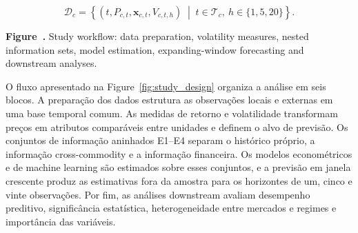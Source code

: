 \documentclass[a4paper,fleqn]{cas-sc}
\begin{document}
\begin{equation}
\mathcal{D}_{c}=\left\{\left(t,P_{c,t},\mathbf{x}_{c,t},V_{c,t,h}\right)\;\middle|\;t\in\mathcal{T}_{c},\ h\in\{1,5,20\}\right\}.
\label{eq:data_unit}
\end{equation}

\begin{center}
\begin{minipage}{\textwidth}
\centering
{}
\noindent\textbf{Figure~\thefigure.} Study workflow: data preparation, volatility measures, nested information sets, model estimation, expanding-window forecasting and downstream analyses.
\end{minipage}
\end{center}
\label{fig:study_design}

O fluxo apresentado na Figure~\ref{fig:study_design} organiza a análise em seis blocos. A preparação dos dados estrutura as observações locais e externas em uma base temporal comum. As medidas de retorno e volatilidade transformam preços em atributos comparáveis entre unidades e definem o alvo de previsão. Os conjuntos de informação aninhados E1--E4 separam o histórico próprio, a informação cross-commodity e a informação financeira. Os modelos econométricos e de machine learning são estimados sobre esses conjuntos, e a previsão em janela crescente produz as estimativas fora da amostra para os horizontes de um, cinco e vinte observações. Por fim, as análises downstream avaliam desempenho preditivo, significância estatística, heterogeneidade entre mercados e regimes e importância das variáveis.
\end{document}
